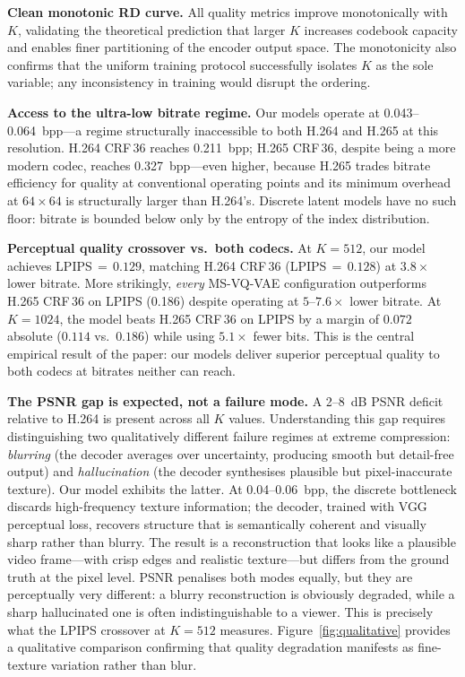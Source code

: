 \documentclass[sigconf, screen, review, anonymous]{acmart}
\begin{document}
\noindent\textbf{Clean monotonic RD curve.}
All quality metrics improve monotonically with $K$, validating the
theoretical prediction that larger $K$ increases codebook capacity and
enables finer partitioning of the encoder output space. The
monotonicity also confirms that the uniform training protocol
successfully isolates $K$ as the sole variable; any inconsistency in
training would disrupt the ordering.

\noindent\textbf{Access to the ultra-low bitrate regime.}
Our models operate at 0.043--0.064~bpp---a regime structurally
inaccessible to both H.264 and H.265 at this resolution. H.264 CRF\,36
reaches 0.211~bpp; H.265 CRF\,36, despite being a more modern codec,
reaches 0.327~bpp---even higher, because H.265 trades bitrate efficiency
for quality at conventional operating points and its minimum overhead
at $64\!\times\!64$ is structurally larger than H.264's. Discrete
latent models have no such floor: bitrate is bounded below only by the
entropy of the index distribution.

\noindent\textbf{Perceptual quality crossover vs.\ both codecs.}
At $K{=}512$, our model achieves LPIPS$\,{=}\,0.129$, matching
H.264 CRF\,36 (LPIPS$\,{=}\,0.128$) at $3.8\times$ lower bitrate.
More strikingly, \emph{every} MS-VQ-VAE configuration outperforms
H.265 CRF\,36 on LPIPS (0.186) despite operating at $5$--$7.6\times$
lower bitrate. At $K{=}1024$, the model beats H.265 CRF\,36 on LPIPS
by a margin of $0.072$ absolute ($0.114$ vs.\ $0.186$) while using
$5.1\times$ fewer bits. This is the central empirical result of the
paper: our models deliver superior perceptual quality to both codecs
at bitrates neither can reach.

\noindent\textbf{The PSNR gap is expected, not a failure mode.}
A 2--8~dB PSNR deficit relative to H.264 is present across all $K$
values. Understanding this gap requires distinguishing two qualitatively
different failure regimes at extreme compression: \emph{blurring} (the
decoder averages over uncertainty, producing smooth but detail-free
output) and \emph{hallucination} (the decoder synthesises plausible but
pixel-inaccurate texture). Our model exhibits the latter. At
0.04--0.06~bpp, the discrete bottleneck discards high-frequency texture
information; the decoder, trained with VGG perceptual loss, recovers
structure that is semantically coherent and visually sharp rather than
blurry. The result is a reconstruction that looks like a plausible
video frame---with crisp edges and realistic texture---but differs from
the ground truth at the pixel level. PSNR penalises both modes equally,
but they are perceptually very different: a blurry reconstruction is
obviously degraded, while a sharp hallucinated one is often
indistinguishable to a viewer. This is precisely what the LPIPS
crossover at $K{=}512$ measures. Figure~\ref{fig:qualitative} provides
a qualitative comparison confirming that quality degradation manifests
as fine-texture variation rather than blur.
\end{document}
